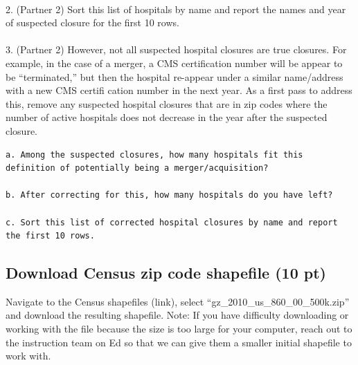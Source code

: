 \documentclass[
  letterpaper,
  DIV=11,
  numbers=noendperiod]{scrartcl}
\makeatletter
\let\oldparagraph\paragraph
\renewcommand{\paragraph}{
    \@ifstar
      \xxxParagraphStar
      \xxxParagraphNoStar
  }
\newcommand{\xxxParagraphStar}[1]{\oldparagraph*{#1}\mbox{}}
\newcommand{\xxxParagraphNoStar}[1]{\oldparagraph{#1}\mbox{}}
\makeatother
\begin{document}
\paragraph{2. (Partner 2) Sort this list of hospitals by name and report
the names and year of suspected closure for the first 10
rows.}\label{partner-2-sort-this-list-of-hospitals-by-name-and-report-the-names-and-year-of-suspected-closure-for-the-first-10-rows.}

\paragraph{3. (Partner 2) However, not all suspected hospital closures
are true closures. For example, in the case of a merger, a CMS
certification number will be appear to be ``terminated,'' but then the
hospital re-appear under a similar name/address with a new CMS certifi
cation number in the next year. As a first pass to address this, remove
any suspected hospital closures that are in zip codes where the number
of active hospitals does not decrease in the year after the suspected
closure.}\label{partner-2-however-not-all-suspected-hospital-closures-are-true-closures.-for-example-in-the-case-of-a-merger-a-cms-certification-number-will-be-appear-to-be-terminated-but-then-the-hospital-re-appear-under-a-similar-nameaddress-with-a-new-cms-certifi-cation-number-in-the-next-year.-as-a-first-pass-to-address-this-remove-any-suspected-hospital-closures-that-are-in-zip-codes-where-the-number-of-active-hospitals-does-not-decrease-in-the-year-after-the-suspected-closure.}

\begin{verbatim}
a. Among the suspected closures, how many hospitals fit this definition of potentially being a merger/acquisition?

b. After correcting for this, how many hospitals do you have left?

c. Sort this list of corrected hospital closures by name and report the first 10 rows.
\end{verbatim}

\subsection{Download Census zip code shapefile (10
pt)}\label{download-census-zip-code-shapefile-10-pt}

Navigate to the Census shapefiles (link), select
``gz\_2010\_us\_860\_00\_500k.zip'' and download the resulting
shapefile. Note: If you have difficulty downloading or working with the
file because the size is too large for your computer, reach out to the
instruction team on Ed so that we can give them a smaller initial
shapefile to work with.
\end{document}
